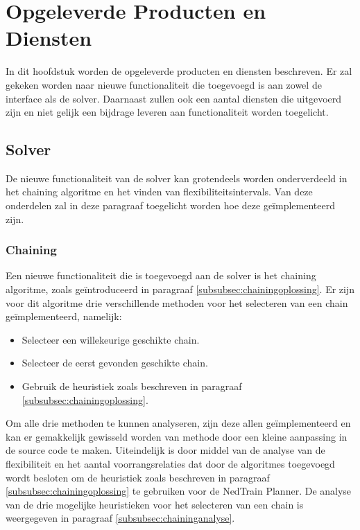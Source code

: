 \section{Opgeleverde Producten en Diensten}
In dit hoofdstuk worden de opgeleverde producten en diensten beschreven. Er zal gekeken worden naar nieuwe functionaliteit die toegevoegd is aan zowel de interface als de solver. Daarnaast zullen ook een aantal diensten die uitgevoerd zijn en niet gelijk een bijdrage leveren aan functionaliteit worden toegelicht.

\subsection{Solver}
De nieuwe functionaliteit van de solver kan grotendeels worden onderverdeeld in het chaining algoritme en het vinden van flexibiliteitsintervals. Van deze onderdelen zal in deze paragraaf toegelicht worden hoe deze ge\"implementeerd zijn.

\subsubsection{Chaining}
Een nieuwe functionaliteit die is toegevoegd aan de solver is het chaining algoritme, zoals ge\"introduceerd in paragraaf \ref{subsubsec:chainingoplossing}. Er zijn voor dit algoritme drie verschillende methoden voor het selecteren van een chain ge\"implementeerd, namelijk:

\begin{itemize}
\item Selecteer een willekeurige geschikte chain.
\item Selecteer de eerst gevonden geschikte chain.
\item Gebruik de heuristiek zoals beschreven in paragraaf \ref{subsubsec:chainingoplossing}.
\end{itemize}

Om alle drie methoden te kunnen analyseren, zijn deze allen ge\"implementeerd en kan er gemakkelijk gewisseld worden van methode door een kleine aanpassing in de source code te maken. Uiteindelijk is door middel van de analyse van de flexibiliteit en het aantal voorrangsrelaties dat door de algoritmes toegevoegd wordt besloten om de heuristiek zoals beschreven in paragraaf \ref{subsubsec:chainingoplossing} te gebruiken voor de NedTrain Planner. De analyse van de drie mogelijke heuristieken voor het selecteren van een chain is weergegeven in paragraaf \ref{subsubsec:chaininganalyse}.

